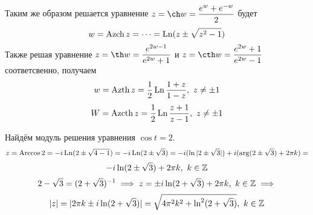 \documentclass[../../main.tex]{subfiles}
\begin{document}
Таким же образом решается уравнение $ z = \ch w = \dfrac{e^{w} + 
e^{-w}}{2} $ будет 
\begin{equation}
\label{lec27:30}
w = \operatorname{Azch} z = \dots = \operatorname{Ln}(z \pm \sqrt{z^2 - 1})
\end{equation}
Также решая уравнение $ z = \th 
w = \dfrac{e^{2w - 1}}{e^{2w} + 1} $ и 
$ z = \cth w = \dfrac{e^{2w} + 1}{e^{2w} - 1} $ соответсвенно,
получаем
\begin{equation}
\label{lec27:31}
w = \operatorname{Azth} z = \dfrac{1}{2} \operatorname{Ln} \dfrac{1 + z}{1 - z},\ z \neq \pm 1
\end{equation}
\begin{equation}
\label{lec27:32}
W = \operatorname{Azcth} z = \dfrac{1}{2} \operatorname{Ln} \dfrac{z + 1}{z - 1},\
z \neq \pm 1
\end{equation}
\begin{exmp}
	Найдём модуль решения уравнения $ \cos t = 2 $.
	\[
	z = \operatorname{Arccos} 2 = -i\operatorname{Ln}(2 \pm \sqrt{4 - 1}) = 
	-i \operatorname{Ln}(2 \pm \sqrt{3}) = -i (\ln|2 \pm \sqrt{3}|) + i(\arg(2 \pm \sqrt{3}) + 
	2\pi k) = \]\[
	-i \ln(2 \pm \sqrt{3}) + 2\pi k,\ k \in \mathbb{Z}	
	\]
	\[
	2 - \sqrt{3} = (2 + \sqrt{3})^{-1} \implies
	z = \pm i \ln (2 + \sqrt{3}) + 2\pi k,\ k \in \mathbb{Z} \implies \] \[
	|z| = |2\pi k \pm i\ln(2 + \sqrt{3})| = 
	\sqrt{4\pi^2 k^2 + \ln^2(2 + \sqrt{3})},\ k \in \mathbb{Z}
	\]
\end{exmp}
\end{document}
